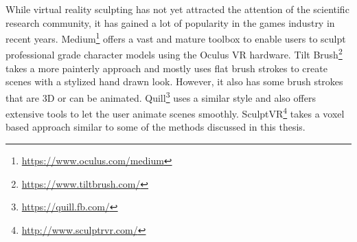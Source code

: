 While virtual reality sculpting has not yet attracted the attention of the scientific research community, it has gained a lot of popularity in the games industry in recent years.
Medium\footnote{\url{https://www.oculus.com/medium}} offers a vast and mature toolbox to enable users to sculpt professional grade character models using the Oculus VR hardware.
Tilt Brush\footnote{\url{https://www.tiltbrush.com/}} takes a more painterly approach and mostly uses flat brush strokes to create scenes with a stylized hand drawn look. However, it also has some brush strokes that are 3D or can be animated. Quill\footnote{\url{https://quill.fb.com/}} uses a similar style and also offers extensive tools to let the user animate scenes smoothly. SculptVR\footnote{\url{http://www.sculptrvr.com/}} takes a voxel based approach similar to some of the methods discussed in this thesis.
